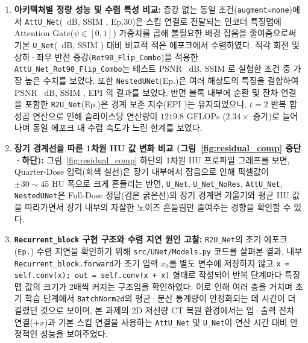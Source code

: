 \documentclass[10pt,a4paper]{article}
\begin{document}
\begin{enumerate}
  \item \textbf{아키텍처별 정량 성능 및 수렴 특성 비교:} 증강 없는 동일 조건(\texttt{augment=none})에서 \texttt{AttU\_Net}(\AttUNetPSNR\ dB, SSIM \AttUNetSSIM, Ep.30)은 스킵 연결로 전달되는 인코더 특징맵에 Attention Gate($\psi \in [0, 1]$) 가중치를 곱해 불필요한 배경 잡음을 줄여줌으로써 기본 \texttt{U\_Net}(\UNetPSNR\ dB, SSIM \UNetSSIM) 대비 비교적 적은 에포크에서 수렴하였다. 직각 회전 및 상하·좌우 반전 증강(\texttt{Rot90\_Flip\_Combo})을 적용한 \texttt{AttU\_Net\_Rot90\_Flip\_Combo}는 테스트 PSNR \AttUNetRotFlipPSNR\ dB, SSIM \AttUNetRotFlipSSIM 로 실험한 조건 중 가장 높은 수치를 보였다. 또한 \texttt{NestedUNet}(Ep.\NestedUNetEpoch)은 여러 해상도의 특징을 결합하여 PSNR \NestedUNetPSNR\ dB, SSIM \NestedUNetSSIM, EPI \NestedUNetEPI 의 결과를 보였다. 반면 블록 내부에 순환 및 잔차 연결을 포함한 \texttt{R2U\_Net}(Ep.\RTwoUNetEpoch)은 경계 보존 지수(EPI \RTwoUNetEPI)는 유지되었으나, $t=2$ 반복 합성곱 연산으로 인해 슬라이스당 연산량이 $1219.8\text{ GFLOPs}$ ($2.34\times$ 증가)로 늘어나며 동일 에포크 내 수렴 속도가 느린 한계를 보였다.
  \item \textbf{장기 경계선을 따른 1차원 HU 값 변화 비교 (그림~\ref{fig:residual_comp} 중단·하단):} 그림~\ref{fig:residual_comp} 하단의 1차원 HU 프로파일 그래프를 보면, Quarter-Dose 입력(회색 실선)은 장기 내부에서 잡음으로 인해 픽셀값이 $\pm 30\sim 45\text{ HU}$ 폭으로 크게 흔들리는 반면, \texttt{U\_Net}, \texttt{U\_Net\_NoRes}, \texttt{AttU\_Net}, \texttt{NestedUNet}은 Full-Dose 정답(검은 굵은선)의 장기 경계면 기울기와 평균 HU 값을 따라가면서 장기 내부의 자잘한 노이즈 흔들림만 줄여주는 경향을 확인할 수 있다.
  \item \textbf{\texttt{Recurrent\_block} 구현 구조와 수렴 지연 원인 고찰:} \texttt{R2U\_Net}의 초기 에포크(\texttt{Ep.\RTwoUNetEpoch}) 수렴 지연을 확인하기 위해 \texttt{src/UNet/Models.py} 코드를 살펴본 결과, 내부 \texttt{Recurrent\_block.forward}가 초기 입력 $x_0$를 별도 변수에 저장하지 않고 \texttt{x = self.conv(x); out = self.conv(x + x)} 형태로 작성되어 반복 단계마다 특징맵 값의 크기가 2배씩 커지는 구조임을 확인하였다. 이로 인해 여러 층을 거치며 초기 학습 단계에서 \texttt{BatchNorm2d}의 평균·분산 통계량이 안정화되는 데 시간이 더 걸렸던 것으로 보이며, 본 과제의 2D 저선량 CT 복원 환경에서는 입·출력 잔차 연결($+x$)과 기본 스킵 연결을 사용하는 \texttt{AttU\_Net} 및 \texttt{U\_Net}이 연산 시간 대비 안정적인 성능을 보여주었다.
\end{enumerate}

\end{document}
